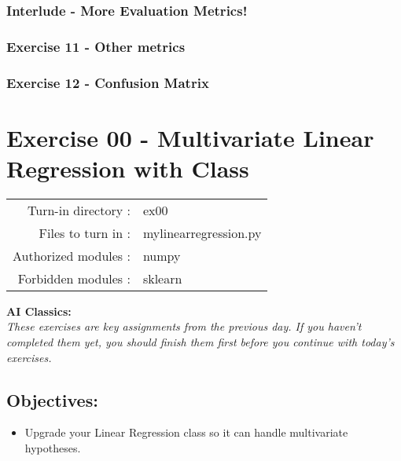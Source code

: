 \documentclass[]{article}
\providecommand{\tightlist}{%
  \setlength{\itemsep}{0pt}\setlength{\parskip}{0pt}}
\begin{document}
\hypertarget{interlude---more-evaluation-metrics}{%
\subsubsection{Interlude - More Evaluation
Metrics!}\label{interlude---more-evaluation-metrics}}

\hypertarget{exercise-11---other-metrics}{%
\subsubsection{Exercise 11 - Other
metrics}\label{exercise-11---other-metrics}}

\hypertarget{exercise-12---confusion-matrix}{%
\subsubsection{Exercise 12 - Confusion
Matrix}\label{exercise-12---confusion-matrix}}

\clearpage

\hypertarget{exercise-00---multivariate-linear-regression-with-class-1}{%
\section{Exercise 00 - Multivariate Linear Regression with
Class}\label{exercise-00---multivariate-linear-regression-with-class-1}}

\begin{longtable}[]{@{}rl@{}}
\toprule
\endhead
Turn-in directory : & ex00\tabularnewline
Files to turn in : & mylinearregression.py\tabularnewline
Authorized modules : & numpy\tabularnewline
Forbidden modules : & sklearn\tabularnewline
\bottomrule
\end{longtable}

\textbf{AI Classics:}\\
\emph{These exercises are key assignments from the previous day. If you
haven't completed them yet, you should finish them first before you
continue with today's exercises.}

\hypertarget{objectives}{%
\subsection{Objectives:}\label{objectives}}

\begin{itemize}
\tightlist
\item
  Upgrade your Linear Regression class so it can handle multivariate
  hypotheses.
\end{itemize}
\end{document}
